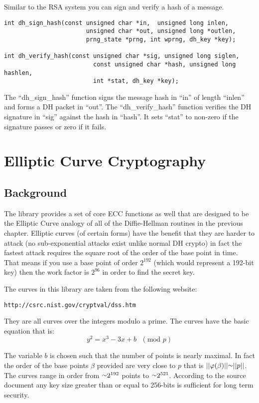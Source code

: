 \documentclass[b5paper]{book}
\def\approx{\raisebox{0.2ex}{\mbox{\small $\sim$}}}
\def\phi{\varphi}
\begin{document}
Similar to the RSA system you can sign and verify a hash of a message.
\begin{verbatim}
int dh_sign_hash(const unsigned char *in,  unsigned long inlen,
                       unsigned char *out, unsigned long *outlen,
                       prng_state *prng, int wprng, dh_key *key);

int dh_verify_hash(const unsigned char *sig, unsigned long siglen,
                         const unsigned char *hash, unsigned long hashlen, 
                         int *stat, dh_key *key);
\end{verbatim}

The ``dh\_sign\_hash'' function signs the message hash in ``in'' of length ``inlen'' and forms a DH packet in ``out''.  
The ``dh\_verify\_hash'' function verifies the DH signature in ``sig'' against the hash in ``hash''.  It sets ``stat''
to non-zero if the signature passes or zero if it fails.

\chapter{Elliptic Curve Cryptography}

\section{Background}
The library provides a set of core ECC functions as well that are designed to be the Elliptic Curve analogy of all of the 
Diffie-Hellman routines in the previous chapter.  Elliptic curves (of certain forms) have the benefit that they are harder
to attack (no sub-exponential attacks exist unlike normal DH crypto) in fact the fastest attack requires the square root
of the order of the base point in time.  That means if you use a base point of order $2^{192}$ (which would represent a
192-bit key) then the work factor is $2^{96}$ in order to find the secret key.

The curves in this library are taken from the following website:
\begin{verbatim}
http://csrc.nist.gov/cryptval/dss.htm
\end{verbatim}

They are all curves over the integers modulo a prime.  The curves have the basic equation that is:
\begin{equation}
y^2 = x^3 - 3x + b\mbox{ }(\mbox{mod }p)
\end{equation}

The variable $b$ is chosen such that the number of points is nearly maximal.  In fact the order of the base points $\beta$ 
provided are very close to $p$ that is $\vert \vert \phi(\beta) \vert \vert \approx \vert \vert p \vert \vert$.  The curves
range in order from $\approx 2^{192}$ points to $\approx 2^{521}$.  According to the source document any key size greater
than or equal to 256-bits is sufficient for long term security.  
\end{document}
